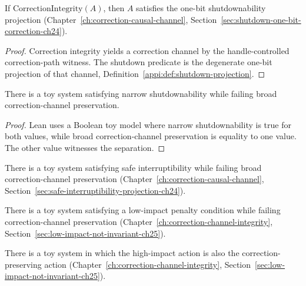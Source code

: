 \begin{corollary}
\label{appi:cor:shutdown-subsumption}
If \(\mathrm{CorrectionIntegrity}(A)\), then \(A\) satisfies the one-bit shutdownability projection (Chapter~\ref{ch:correction-causal-channel}, Section~\ref{sec:shutdown-one-bit-correction-ch24}).
\end{corollary}
\begin{proof}
Correction integrity yields a correction channel by the handle-controlled correction-path witness. The shutdown predicate is the degenerate one-bit projection of that channel, Definition~\ref{appi:def:shutdown-projection}.
\end{proof}

\begin{theorem}
\label{appi:thm:shutdown-not-corrigibility}
There is a toy system satisfying narrow shutdownability while failing broad correction-channel preservation.
\end{theorem}
\begin{proof}
Lean uses a Boolean toy model where narrow shutdownability is true for both values, while broad correction-channel preservation is equality to one value. The other value witnesses the separation.
\end{proof}

\begin{theorem}
\label{appi:thm:safe-interruptibility-not-correction}
There is a toy system satisfying safe interruptibility while failing broad correction-channel preservation (Chapter~\ref{ch:correction-causal-channel}, Section~\ref{sec:safe-interruptibility-projection-ch24}).
\end{theorem}

\begin{theorem}
\label{appi:thm:low-impact-not-correction}
There is a toy system satisfying a low-impact penalty condition while failing correction-channel preservation (Chapter~\ref{ch:correction-channel-integrity}, Section~\ref{sec:low-impact-not-invariant-ch25}).
\end{theorem}

\begin{theorem}
\label{appi:thm:correction-high-impact}
There is a toy system in which the high-impact action is also the correction-preserving action (Chapter~\ref{ch:correction-channel-integrity}, Section~\ref{sec:low-impact-not-invariant-ch25}).
\end{theorem}


